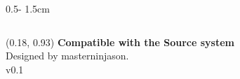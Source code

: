 \documentclass{uioposter}
\begin{document}
\begin{frame}
\begin{columns}[onlytextwidth]
\begin{column}{0.5\textwidth - 1.5cm}
    
\end{column}


\end{columns}


\begin{textblock}{0.5}(0.18, 0.93)
    \color{white}
    \sffamily
    \textbf{Compatible with the Source system}
    \\
    Designed by masterninjason.
    \\
    v0.1
\end{textblock}


\end{frame}
\end{document}
